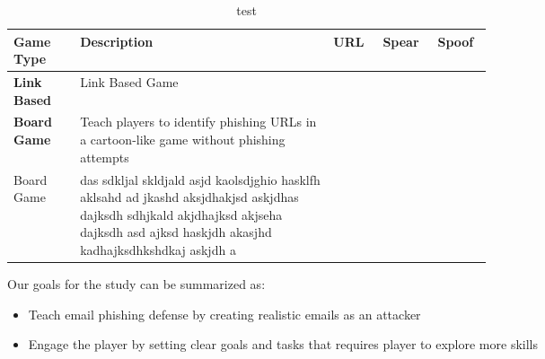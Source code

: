 \begin{table}[h]
    \centering
    \begin{tabular}{|p{0.1\linewidth}|p{0.4\linewidth}|p{0.04\linewidth}|p{0.04\linewidth}|p{0.04\linewidth}|}
        \hline
        \textbf{Game Type}   & \textbf{Description}                                                                                                                                                                  & \textbf{URL} & \textbf{Spear} & \textbf{Spoof} \\
        \hline
        \textbf{Link Based } & Link Based Game                                                                                                                                                                       &              &                &                \\

        \textbf{Board Game}  & Teach players to identify phishing URLs in a cartoon-like game without phishing attempts                                                                                              &              &                &                \\
        Board Game           & das sdkljal skldjald asjd kaolsdjghio hasklfh aklsahd ad jkashd aksjdhakjsd askjdhas dajksdh sdhjkald akjdhajksd akjseha dajksdh asd ajksd haskjdh akasjhd kadhajksdhkshdkaj askjdh a &              &                &                \\
        \hline
    \end{tabular}%
    \caption{test}
    \label{tab:my-table}
\end{table}

Our goals for the study can be summarized as:

\begin{itemize}
    \item Teach email phishing defense by creating realistic emails as an attacker
    \item Engage the player by setting clear goals and tasks that requires player to explore more skills
\end{itemize}



